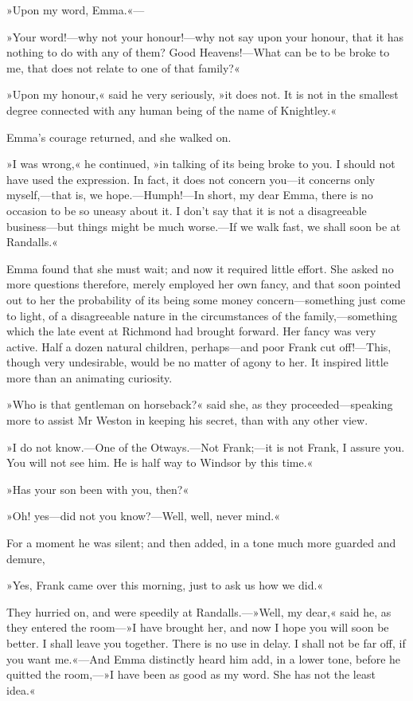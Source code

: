 »Upon my word, Emma.«—

»Your word!—why not your honour!—why not say upon your honour, that it has nothing to do with any of them? Good Heavens!—What can be to be broke to me, that does not relate to one of that family?«

»Upon my honour,« said he very seriously, »it does not. It is not in the smallest degree connected with any human being of the name of Knightley.«

Emma's courage returned, and she walked on.

»I was wrong,« he continued, »in talking of its being broke to you. I should not have used the expression. In fact, it does not concern you—it concerns only myself,—that is, we hope.—Humph!—In short, my dear Emma, there is no occasion to be so uneasy about it. I don't say that it is not a disagreeable business—but things might be much worse.—If we walk fast, we shall soon be at Randalls.«

Emma found that she must wait; and now it required little effort. She asked no more questions therefore, merely employed her own fancy, and that soon pointed out to her the probability of its being some money concern—something just come to light, of a disagreeable nature in the circumstances of the family,—something which the late event at Richmond had brought forward. Her fancy was very active. Half a dozen natural children, perhaps—and poor Frank cut off!—This, though very undesirable, would be no matter of agony to her. It inspired little more than an animating curiosity.

»Who is that gentleman on horseback?« said she, as they proceeded—speaking more to assist Mr Weston in keeping his secret, than with any other view.

»I do not know.—One of the Otways.—Not Frank;—it is not Frank, I assure you. You will not see him. He is half way to Windsor by this time.«

»Has your son been with you, then?«

»Oh! yes—did not you know?—Well, well, never mind.«

For a moment he was silent; and then added, in a tone much more guarded and demure,

»Yes, Frank came over this morning, just to ask us how we did.«

They hurried on, and were speedily at Randalls.—»Well, my dear,« said he, as they entered the room—»I have brought her, and now I hope you will soon be better. I shall leave you together. There is no use in delay. I shall not be far off, if you want me.«—And Emma distinctly heard him add, in a lower tone, before he quitted the room,—»I have been as good as my word. She has not the least idea.«

